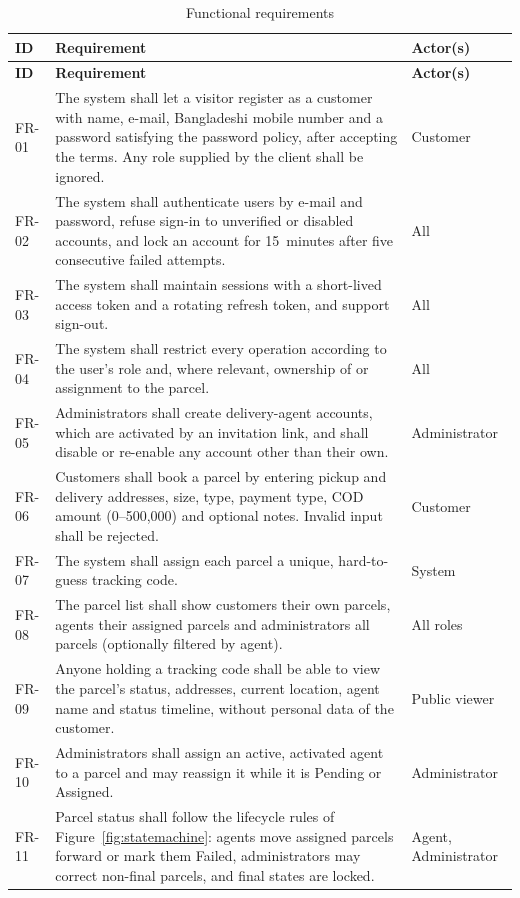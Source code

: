 \begin{longtable}{@{}P{1.3cm}P{9.2cm}P{3.2cm}@{}}
\caption{Functional requirements}\label{tab:fr}\\
\toprule
\textbf{ID} & \textbf{Requirement} & \textbf{Actor(s)} \\
\midrule
\endfirsthead
\toprule
\textbf{ID} & \textbf{Requirement} & \textbf{Actor(s)} \\
\midrule
\endhead
FR-01 & The system shall let a visitor register as a customer with name, e-mail, Bangladeshi mobile number and a password satisfying the password policy, after accepting the terms. Any role supplied by the client shall be ignored. & Customer \\
FR-02 & The system shall authenticate users by e-mail and password, refuse sign-in to unverified or disabled accounts, and lock an account for 15~minutes after five consecutive failed attempts. & All \\
FR-03 & The system shall maintain sessions with a short-lived access token and a rotating refresh token, and support sign-out. & All \\
FR-04 & The system shall restrict every operation according to the user's role and, where relevant, ownership of or assignment to the parcel. & All \\
FR-05 & Administrators shall create delivery-agent accounts, which are activated by an invitation link, and shall disable or re-enable any account other than their own. & Administrator \\
FR-06 & Customers shall book a parcel by entering pickup and delivery addresses, size, type, payment type, COD amount (0--500{,}000) and optional notes. Invalid input shall be rejected. & Customer \\
FR-07 & The system shall assign each parcel a unique, hard-to-guess tracking code. & System \\
FR-08 & The parcel list shall show customers their own parcels, agents their assigned parcels and administrators all parcels (optionally filtered by agent). & All roles \\
FR-09 & Anyone holding a tracking code shall be able to view the parcel's status, addresses, current location, agent name and status timeline, without personal data of the customer. & Public viewer \\
FR-10 & Administrators shall assign an active, activated agent to a parcel and may reassign it while it is Pending or Assigned. & Administrator \\
FR-11 & Parcel status shall follow the lifecycle rules of Figure~\ref{fig:statemachine}: agents move assigned parcels forward or mark them Failed, administrators may correct non-final parcels, and final states are locked. & Agent, Administrator \\

\end{longtable}
